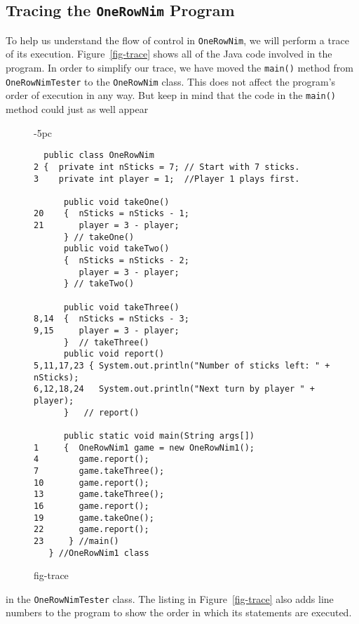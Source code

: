 \subsection{Tracing the {\tt OneRowNim} Program}
\label{subsect-trace}

\noindent To help us understand the flow of control in {\tt OneRowNim}, 
we will perform a trace of its execution. Figure~\ref{fig-trace} shows
all of the Java code involved in the program. In order to simplify our
trace, we have moved the {\tt main()} method from {\tt
OneRowNimTester} to the {\tt OneRowNim} class. This does not affect
the program's order of execution in any way. But keep in mind that the
code in the {\tt main()} method could just as well appear

\begin{figure}[tb]
\jjjprogstart
\begin{jjjlistingleft}[31pc]{-5pc}
\begin{lstlisting}
  public class OneRowNim 
2 {  private int nSticks = 7; // Start with 7 sticks.
3    private int player = 1;  //Player 1 plays first.

      public void takeOne()
20    {  nSticks = nSticks - 1;
21       player = 3 - player;  
      } // takeOne()
      public void takeTwo()
      {  nSticks = nSticks - 2;
         player = 3 - player; 
      } // takeTwo()

      public void takeThree()
8,14  {  nSticks = nSticks - 3;
9,15     player = 3 - player; 
      }  // takeThree()
      public void report()
5,11,17,23 { System.out.println("Number of sticks left: " + nSticks);
6,12,18,24   System.out.println("Next turn by player " + player);
      }   // report()

      public static void main(String args[])
1     {  OneRowNim1 game = new OneRowNim1();
4        game.report();
7        game.takeThree();
10       game.report();
13       game.takeThree();
16       game.report();
19       game.takeOne();
22       game.report();
23     } //main()
   } //OneRowNim1 class
\end{lstlisting}
\end{jjjlistingleft}
{fig-trace}
\end{figure}
in the {\tt OneRowNimTester} class.  The listing in
Figure~\ref{fig-trace} also adds line numbers to the program to show
the order in which its statements are executed.

